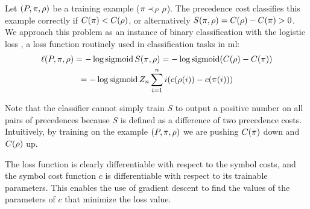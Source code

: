 Let $(P, \pi, \rho)$ be a training example ($\pi \prec_{P} \rho$).
The precedence cost classifies this example correctly if $C(\pi) < C(\rho)$,
or alternatively $S(\pi, \rho) = C(\rho) - C(\pi) > 0$.
We approach this problem as an instance of binary classification with the logistic loss \cite{Mohri2018},
a loss function routinely used in classification tasks in \acrlong{ml}:
\begin{multline*}
\ell(P, \pi, \rho)
= - \log \operatorname{sigmoid} S(\pi, \rho)
= - \log \operatorname{sigmoid} (C(\rho) - C(\pi)) \\
= - \log \operatorname{sigmoid} Z_n \sum_{i=1}^n i (c(\rho(i)) - c(\pi(i)))
\end{multline*}

Note that the classifier cannot simply train $S$ to output a positive number on all pairs of precedences
because $S$ is defined as a difference of two precedence costs.
Intuitively, by training on the example $(P, \pi, \rho)$
we are pushing $C(\pi)$ down and $C(\rho)$ up.

The loss function is clearly differentiable with respect to the symbol costs,
and the symbol cost function $c$ is differentiable with respect to its trainable parameters.
This enables the use of gradient descent to find the values of the parameters of $c$
that minimize the loss value. 
